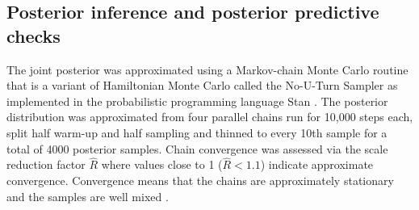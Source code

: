 \documentclass{article}
\begin{document}
%
%


\subsection{Posterior inference and posterior predictive checks}
The joint posterior was approximated using a Markov-chain Monte Carlo routine that is a variant of Hamiltonian Monte Carlo called the No-U-Turn Sampler \citep{Hoffman2014} as implemented in the probabilistic programming language Stan \citep{2014stan}. The posterior distribution was approximated from four parallel chains run for 10,000 steps each, split half warm-up and half sampling and thinned to every 10th sample for a total of 4000 posterior samples. Chain convergence was assessed via the scale reduction factor \(\hat{R}\) where values close to 1 (\(\hat{R} < 1.1\)) indicate approximate convergence. Convergence means that the chains are approximately stationary and the samples are well mixed \citep{Gelman2013d}.
\end{document}
